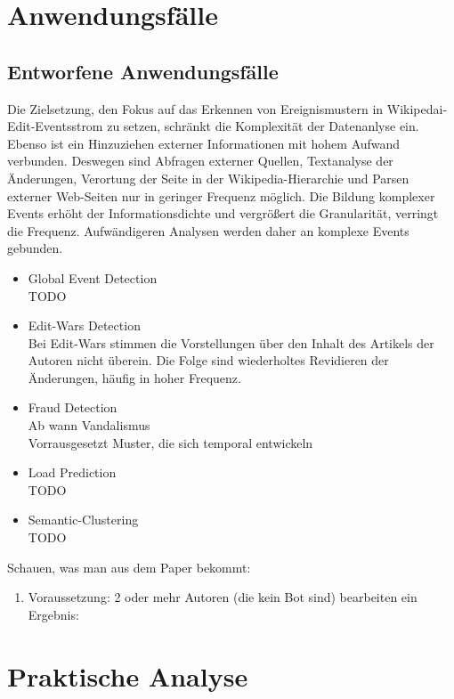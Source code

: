 \section{Anwendungsfälle}
\subsection{Entworfene Anwendungsfälle}
Die Zielsetzung, den Fokus auf das Erkennen von Ereignismustern in Wikipedai-Edit-Eventsstrom zu setzen, schränkt die Komplexität der Datenanlyse ein. Ebenso ist ein Hinzuziehen externer Informationen mit hohem Aufwand verbunden. Deswegen sind Abfragen externer Quellen, Textanalyse der Änderungen, Verortung der Seite in der Wikipedia-Hierarchie und Parsen externer Web-Seiten nur in geringer Frequenz möglich. Die Bildung komplexer Events erhöht der Informationsdichte und vergrößert die Granularität, verringt die Frequenz. Aufwändigeren Analysen werden daher an komplexe Events gebunden.

\begin{itemize}
    \item Global Event Detection\\ TODO
    \item Edit-Wars Detection\\ Bei Edit-Wars stimmen die Vorstellungen über den Inhalt des Artikels der Autoren nicht überein. Die Folge sind wiederholtes Revidieren der Änderungen, häufig in hoher Frequenz.
    \item Fraud Detection\\Ab wann Vandalismus \\Vorrausgesetzt Muster, die sich temporal entwickeln
    \item Load Prediction\\ TODO
    \item Semantic-Clustering\\ TODO
\end{itemize}


Schauen, was man aus dem Paper bekommt: \cite{10.1007978-3-642-36973-5_22}

\begin{enumerate}
    \item
    Voraussetzung: 2 oder mehr Autoren (die kein Bot sind) bearbeiten ein
    Ergebnis:
\end{enumerate}




\section{Praktische Analyse}

